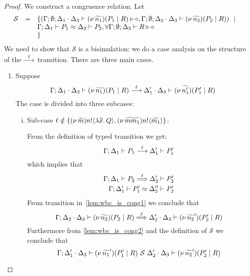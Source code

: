 \begin{proof}
	\noi We construct a congruence relation. Let
	\[
	\begin{array}{rcl}
		\mathcal{S} &=&	\{
				(\Gamma; \emptyset; \Delta_1 \cdot \Delta_3 \vdash (\nu\, \widetilde{n_1})(P_1 \;|\; R) \triangleright \diamond,
				\Gamma; \emptyset; \Delta_2 \cdot \Delta_3 \vdash (\nu\, \widetilde{n_2})(P_2 \;|\; R))
				\ \ |\ \  \\
		& &		\Gamma; \Delta_1 \vdash P_1 \approx \Delta_2 \vdash P_2, \forall \Gamma; \emptyset; \Delta_3 \vdash R \triangleright \diamond\\
		& &\}
	\end{array}
	\]
	\noi We need to show that 
	$\mathcal{S}$ is a bisimulation:  we do a case analysis on the structure
	of the $\stackrel{\ell}{\longrightarrow}$ transition. There are three main cases.


	\begin{enumerate}

		\item Suppose
				\[
					\Gamma; \Delta_1 \cdot \Delta_3 \vdash (\nu\, \widetilde{n_1})(P_1 \;|\; R) \stackrel{\ell}{\longrightarrow} \Delta_1' \cdot \Delta_3 \vdash (\nu\, \widetilde{n_1'})(P_1' \;|\; R)
				\]
				\noi The case is divided into three subcases:

				\begin{enumerate}[i.]
					\item Sub-case	$\ell \notin \{(\nu\, \widetilde{m}) n ! \langle \lambda \widetilde{x}.\,Q \rangle, (\nu\, \widetilde{mm_1}) n ! \langle \widetilde{m_1} \rangle\}$:
					
							\noi From the definition of typed transition we get:
							\[
								\Gamma; \Delta_1 \vdash P_1 \stackrel{\ell}{\longrightarrow} \Delta_1' \vdash P_1'
							\]
							\noi which implies that
							\begin{eqnarray}
								\Gamma; \Delta_1 \vdash P_2 \stackrel{\ell}{\Longrightarrow} \Delta_2' \vdash P_2'
								\label{lem:wbc_is_cong1}\\
								\Gamma; \Delta_1' \vdash P_1' \approx \Delta_2'' \vdash P_2'
								\label{lem:wbc_is_cong2}
							\end{eqnarray}
							\noi From transition in~\eqref{lem:wbc_is_cong1} we conclude that 
							\[
								\Gamma; \Delta_2 \cdot \Delta_3 \vdash (\nu\, \widetilde{n_2})(P_2 \;|\; R) \stackrel{\ell}{\Longrightarrow} \Delta_2' \cdot \Delta_3 \vdash (\nu\, \widetilde{n_2}')(P_2' \;|\; R)
							\]
							\noi Furthermore from \eqref{lem:wbc_is_cong2} and the definition of $\mathcal{S}$ we conclude that
							\[
								\Gamma; \Delta_1' \cdot \Delta_3 \vdash (\nu\, \widetilde{n_1}')(P_1' \;|\; R) \ \mathcal{S}\  \Delta_2' \cdot \Delta_3 \vdash (\nu\, \widetilde{n_2}')(P_2' \;|\; R)
							\]


\end{enumerate}
\end{enumerate}
\end{proof}
